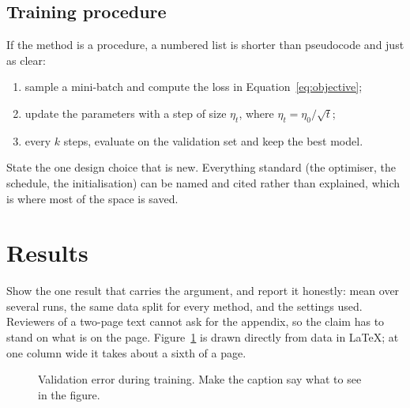 \documentclass[10pt,a4paper,twocolumn]{article}
\begin{document}
\subsection{Training procedure}
If the method is a procedure, a numbered list is shorter than pseudocode and just as clear:
\begin{enumerate}\itemsep=0pt\topsep=2pt\parsep=0pt
  \item sample a mini-batch and compute the loss in Equation~\eqref{eq:objective};
  \item update the parameters with a step of size $\eta_t$, where
        $\eta_t = \eta_0 / \sqrt{t}$;
  \item every $k$ steps, evaluate on the validation set and keep the best model.
\end{enumerate}
State the one design choice that is new. Everything standard (the optimiser, the schedule,
the initialisation) can be named and cited rather than explained, which is where most of
the space is saved.

\section{Results}\label{sec:results}
Show the one result that carries the argument, and report it honestly: mean over several
runs, the same data split for every method, and the settings used. Reviewers of a two-page
text cannot ask for the appendix, so the claim has to stand on what is on the page. Figure~\ref{fig:curve} is drawn directly
from data in \LaTeX{}; at one column wide it takes about a sixth of a page.

\begin{figure}[t]
  \centering
  \caption{Validation error during training. Make the caption say what to see in the figure.}
  \label{fig:curve}
\end{figure}
\end{document}
